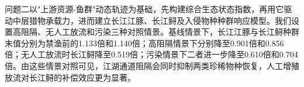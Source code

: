 问题二以"上游资源-鱼群"动态轨迹为基础，先构建综合生态状态指数，再用它驱动中层猎物承载力，进而建立长江江豚、长江鲟及入侵物种种群响应模型。我们设置高阻隔、无人工放流和污染三种对照情景。基线情景下，长江江豚与长江鲟种群末值分别为禁渔前的1.133倍和1.140倍；高阻隔情景下分别降至0.901倍和0.856倍；无人工放流时长江鲟降至0.519倍；污染情景下二者进一步降至0.610倍和0.704倍。由这些情景对照可见，江湖通道阻隔会同时抑制两类珍稀物种恢复，人工增殖放流对长江鲟的补偿效应更为显著。